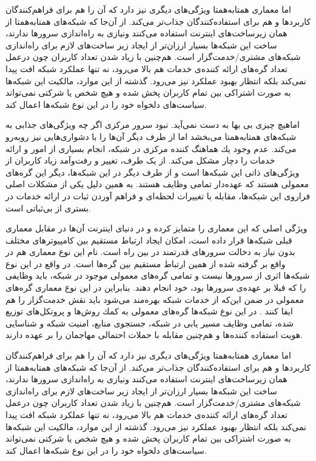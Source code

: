 \documentclass[12pt,twoside]{xepersian-magazine}
\begin{document}
\begin{article}{2}
اما معماری همتابه‌همتا ويژگی‌های ديگری نيز دارد که آن را هم برای فراهم‌کنندگان کاربردها و هم برای استفاده‌کنندگان جذاب‌تر می‌کند.  از آن‌جا که شبکه‌های همتابه‌همتا از همان زيرساخت‌های اينترنت استفاده می‌کنند ونيازی به راه‌اندازی سرورها ندارند، ساخت اين شبكه‌ها بسيار ارزان‌تر از ايجاد زير ساخت‌های لازم برای راه‌اندازی شبكه‌های مشتری/خدمت‌گزار است.  هم‌چنين با زياد شدن تعداد کاربران چون درعمل تعداد گره‌های ارائه کننده‌ی خدمات هم بالا می‌رود، نه تنها عملكرد شبكه افت پيدا نمی‌كند بلكه انتظار بهبود عملکرد نيز می‌رود. گذشته از اين موارد، مالكيت اين شبكه‌ها به صورت اشتراكی بين تمام کاربران پخش شده و هيچ شخص يا شركتی نمی‌تواند سياست‌های دلخواه خود را در اين نوع شبكه‌ها اعمال کند.

اماهيچ چيزی بی‌ بها به دست نمی‌آید. نبود سرور مرکزی اگر چه  ويژگی‌های جذابی به شبکه‌های همتابه‌همتا می‌بخشد اما از طرف ديگر آن‌ها را با دشواری‌هايی نيز روبه‌رو می‌کند.  عدم وجود يك هماهنگ كننده مركزی در شبكه، انجام بسياری از امور و ارائه خدمات را  دچار مشكل می‌کند.  از يک طرف، تغيير و رفت‌وآمد زیاد کاربران از ويژگی‌های ذاتی اين شبکه‌ها است و از طرف ديگر در اين شبكه‌ها، ديگر اين گره‌های معمولی  هستند كه  عهده‌دار تمامی وظايف هستند. به همين دلیل يکی از مشکلات اصلی فراروی اين شبكه‌ها، مقابله با  تغييرات لحظه‌ای و فراهم آوردن ثبات در ارائه  خدمات در بستری از بی‌ثباتی است.


ويژگی اصلی که اين معماری را متمايز کرده و در دنيای اينترنت آن‌ها در مقابل معماری قبلی شبكه‌ها قرار داده است، امكان ايجاد ارتباط مستقيم  بين كامپيوترهای مختلف بدون نياز به دخالت سرورهای قدرتمند در بين راه است.  نام‌ اين نوع معماری هم در واقع بر گرفته شده از همین  ارتباط مستقیم بين گره‌ها است.  در واقع در اين نوع شبكه‌ها اثری از سرورها نيست و تمامی گره‌های معمولی موجود در شبكه، بايد وظايفی را که قبلا بر عهده‌ی سرورها بود، خود انجام دهند. بنابراين در اين نوع معماری گره‌های معمولی در ضمن اين‌که از خدمات شبکه بهره‌مند می‌شود بايد نقش خدمت‌گزار را هم ايفا کنند . در اين نوع شبکه‌ها گره‌های معمولی به كمك روش‌ها و پروتكل‌های توزيع شده، تمامی وظايف  مسير يابی در شبكه، جستجوی منابع، امنيت شبكه و شناسايی هويت استفاده كننده‌ها و هم‌چنين مقابله با حملات احتمالی مهاجمان را بر عهده دارند.

اما معماری همتابه‌همتا ويژگی‌های ديگری نيز دارد که آن را هم برای فراهم‌کنندگان کاربردها و هم برای استفاده‌کنندگان جذاب‌تر می‌کند.  از آن‌جا که شبکه‌های همتابه‌همتا از همان زيرساخت‌های اينترنت استفاده می‌کنند ونيازی به راه‌اندازی سرورها ندارند، ساخت اين شبكه‌ها بسيار ارزان‌تر از ايجاد زير ساخت‌های لازم برای راه‌اندازی شبكه‌های مشتری/خدمت‌گزار است.  هم‌چنين با زياد شدن تعداد کاربران چون درعمل تعداد گره‌های ارائه کننده‌ی خدمات هم بالا می‌رود، نه تنها عملكرد شبكه افت پيدا نمی‌كند بلكه انتظار بهبود عملکرد نيز می‌رود. گذشته از اين موارد، مالكيت اين شبكه‌ها به صورت اشتراكی بين تمام کاربران پخش شده و هيچ شخص يا شركتی نمی‌تواند سياست‌های دلخواه خود را در اين نوع شبكه‌ها اعمال کند.


\end{article}
\end{document}
